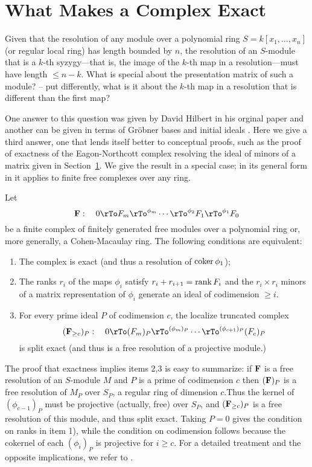 \section{What Makes a Complex Exact}

Given that the resolution of any module over a polynomial ring $S = k[x_1,\dots,x_n]$ (or regular local ring) has  length bounded by $n$, the resolution of an $S$-module that is a $k$-th syzygy---that is, the image of the $k$-th map in a resolution---must have length $\leq n-k$. What is special about the presentation matrix of such a module? -- put differently, what is it about the $k$-th map in a resolution that is different than the first map?

One answer to this question was given by David Hilbert in his orginal paper \cite{} and another can be given in terms of Gr\"obner bases and initial ideals \cite{}. Here we give a third answer, one that lends itself better to conceptual proofs, such as the proof of exactness of the Eagon-Northcott complex resolving the ideal of minors of a matrix given in Section~\ref{}. We give the result in a special case; in its general form in \cite{} it applies to finite free complexes over any ring.

\begin{theorem}\label{WMACE} Let 
$$
{\bf F}:  \quad 0\rTo F_m\rTo^{\phi_m} \cdots\rTo^{\phi_2} F_1\rTo^{\phi_1} F_0
$$
be a finite complex of finitely generated free modules over a polynomial ring or, more generally, a Cohen-Macaulay ring. The following conditions are equivalent:
\begin{enumerate}

\item The complex is exact (and thus a resolution of $\coker \phi_1$);

\item The ranks $r_i$ of the maps $\phi_i$ satisfy $r_i+r_{i+1}  = \rank F_i$ and the $r_i\times r_i$ minors of a matrix representation of
$\phi_i$ generate an ideal of codimension $\geq i$.

\item For every prime ideal $P$ of codimension $c$, the localize truncated complex 
$$
({\bf F}_{\geq c})_P: \quad 0\rTo (F_m)_P\rTo^{(\phi_m)_P} \cdots\rTo^{(\phi_{c+1})_P} (F_c)_P
$$
is split exact (and thus is a free resolution of a projective module.)
\end{enumerate}
\end{theorem}

The proof that exactness implies items 2,3 is easy to summarize: if ${\bf F}$ is a free resolution of an $S$-module $M$ and $P$ is a prime of codimension $c$
then $({\bf F})_P$ is a free resolution of
$M_P$ over $S_P$, a regular ring of dimension $c$.Thus the kernel of $(\phi_{c-1})_P$ must be projective (actually, free) over $S_P$, 
and $({\bf F}_{\geq c})_P$ is a free resolution of this module, and thus split exact. Taking $P = 0$ gives the condition on ranks in
item 1), while the condition on codimension follows because the cokernel of each $(\phi_i)_P$ is projective for $i\geq c$. For a detailed treatment and the opposite implications, we refer to \cite{book}.

